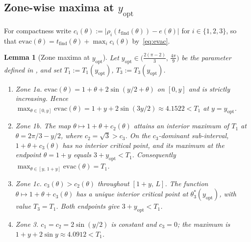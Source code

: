 \documentclass[11pt]{article}
\theoremstyle{plain}
\newtheorem{lemma}[theorem]{Lemma}
\theoremstyle{definition}
\theoremstyle{remark}
\begin{document}
\subsection{Zone-wise maxima at $y_{\mathrm{opt}}$}

For compactness write $c_i(\theta) := \lvert\rho_i(t_{\mathrm{find}}
(\theta)) - e(\theta)\rvert$ for $i \in \{1,2,3\}$, so that
$\mathrm{evac}(\theta) = t_{\mathrm{find}}(\theta) + \max_i c_i(\theta)$
by~\eqref{eq:evac}.

\begin{lemma}[Zone maxima at $y_{\mathrm{opt}}$]
\label{lem:zone-max}
Let $y_{\mathrm{opt}} \in \bigl(\tfrac{2(\pi-2)}{3},\,
\tfrac{4\pi}{9}\bigr)$ be the parameter defined in
, and set $T_1 := T_1(y_{\mathrm{opt}})$, $T_3
:= T_3(y_{\mathrm{opt}})$.
\begin{enumerate}
\item \emph{Zone 1a.} $\mathrm{evac}(\theta) = 1 + \theta + 2\sin(y/2 +
\theta)$ on $[0, y]$ and is strictly increasing. Hence $\max_{\theta
\in [0, y]} \mathrm{evac}(\theta) = 1 + y + 2\sin(3y/2) \approx 4.1522
< T_1$ at $y = y_{\mathrm{opt}}$.
\item \emph{Zone 1b.} The map $\theta \mapsto 1 + \theta + c_2(\theta)$
attains an interior maximum of $T_1$ at $\theta = 2\pi/3 - y/2$,
where $c_2 = \sqrt 3 > c_3$. On the $c_3$-dominant sub-interval, $1 +
\theta + c_3(\theta)$ has no interior critical point, and its maximum
at the endpoint $\theta = 1 + y$ equals $3 + y_{\mathrm{opt}} < T_1$.
Consequently $\max_{\theta \in [y,\, 1+y]} \mathrm{evac}(\theta) = T_1$.
\item \emph{Zone 1c.} $c_3(\theta) > c_2(\theta)$ throughout $[1+y,\,
L]$. The function $\theta \mapsto 1 + \theta + c_3(\theta)$ has a
unique interior critical point at $\theta_3^*(y_{\mathrm{opt}})$, with
value $T_3 = T_1$. Both endpoints give $3 + y_{\mathrm{opt}} < T_1$.
\item \emph{Zone 3.} $c_1 = c_2 = 2\sin(y/2)$ is constant and $c_3 = 0$;
the maximum is $1 + y + 2\sin y \approx 4.0912 < T_1$.
\end{enumerate}
\end{lemma}
\end{document}
